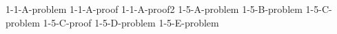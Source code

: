 \documentclass[uplatex, dvipdfmx, a4paper, 12pt, class=jsarticle, crop=false]{standalone}
\begin{document}
	{1-1-A-problem}
	{1-1-A-proof}
	{1-1-A-proof2}
	{1-5-A-problem}
	{1-5-B-problem}
	{1-5-C-problem}
	{1-5-C-proof}
	{1-5-D-problem}
	{1-5-E-problem}
\end{document}
